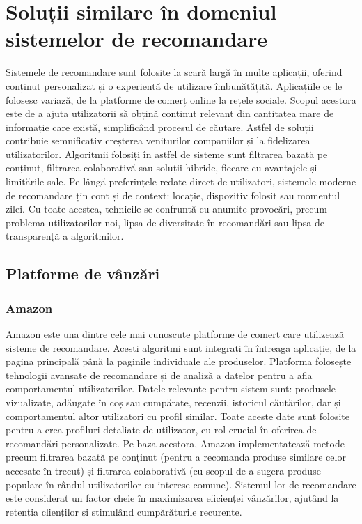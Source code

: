 \chapter{Soluții similare în domeniul sistemelor de recomandare}
\label{chap:ch2}

Sistemele de recomandare sunt folosite la scară largă în multe aplicații, oferind conținut personalizat și o experientă de utilizare îmbunătățită. 
Aplicațiile ce le folosesc variază, de la platforme de comerț online la rețele sociale.
Scopul acestora este de a ajuta utilizatorii să obțină conținut relevant din cantitatea mare de informație care există, simplificând procesul de căutare.
Astfel de soluții contribuie semnificativ creșterea veniturilor companiilor și la fidelizarea utilizatorilor.
Algoritmii folosiți în astfel de sisteme sunt filtrarea bazată pe conținut, filtrarea colaborativă sau soluții hibride, fiecare cu avantajele și limitările sale.
Pe lângă preferințele redate direct de utilizatori, sistemele moderne de recomandare țin cont și de context: locație, dispozitiv folosit sau momentul zilei.
Cu toate acestea, tehnicile se confruntă cu anumite provocări, precum problema utilizatorilor noi, lipsa de diversitate în recomandări sau lipsa de transparență a algoritmilor.

\section{Platforme de vânzări}
\label{sec:ch2sec1}
\subsection*{Amazon}
Amazon este una dintre cele mai cunoscute platforme de comerț care utilizează sisteme de recomandare.
Acesti algoritmi sunt integrați în întreaga aplicație, de la pagina principală până la paginile individuale ale produselor.
Platforma folosește tehnologii avansate de recomandare și de analiză a datelor pentru a afla comportamentul utilizatorilor.
Datele relevante pentru sistem sunt: produsele vizualizate, adăugate în coș sau cumpărate, recenzii, istoricul căutărilor, dar și comportamentul altor utilizatori cu profil similar. 
Toate aceste date sunt folosite pentru a crea profiluri detaliate de utilizator, cu rol crucial în oferirea de recomandări personalizate.
Pe baza acestora, Amazon implementatează metode precum filtrarea bazată pe conținut (pentru a recomanda produse similare celor accesate în trecut) și filtrarea colaborativă (cu scopul de a sugera produse populare în rândul utilizatorilor cu interese comune).
Sistemul lor de recomandare este considerat un factor cheie în maximizarea eficienței vânzărilor, ajutând la retenția clienților și stimulând cumpărăturile recurente\cite{ahmed2022amazon, smith2017two}.

